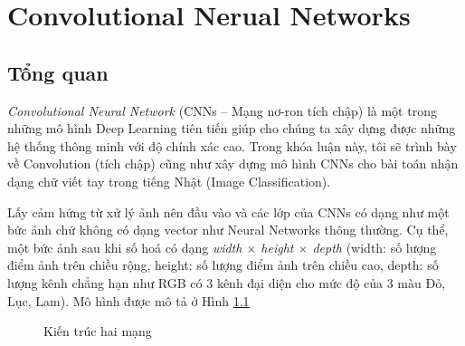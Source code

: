 \chapter{Convolutional Nerual Networks}
\label{chap:chap4}

\section{Tổng quan}
\textit{Convolutional Neural Network }(CNNs – Mạng nơ-ron tích chập) là một trong những mô hình Deep Learning tiên tiến giúp cho chúng ta xây dựng được những hệ thống thông minh với độ chính xác cao. Trong khóa luận này, tôi sẽ trình bày về  Convolution (tích chập) cũng như xây dựng mô hình CNNs cho bài toán nhận dạng chữ viết tay trong tiếng Nhật (Image Classification).\par
Lấy cảm hứng từ xử lý ảnh nên đầu vào và các lớp của CNNs có dạng như một bức ảnh chứ không có dạng vector như Neural Networks thông thường. Cụ thể, một bức ảnh sau khi số hoá có dạng \textit{width $\times$ height $\times$ depth} (width: số lượng điểm ảnh trên chiều rộng, height: số lượng điểm ảnh trên chiều cao, depth: số lượng kênh chẳng hạn như RGB có 3 kênh đại diện cho mức độ của 3 màu Đỏ, Lục, Lam). Mô hình được mô tả ở Hình \ref{fig:conv}

\begin{center}
\begin{figure}[H]
\label{fig:conv}
\begin{center}
\caption{Kiến trúc hai mạng}
\end{center}

\end{figure}
\end{center}

